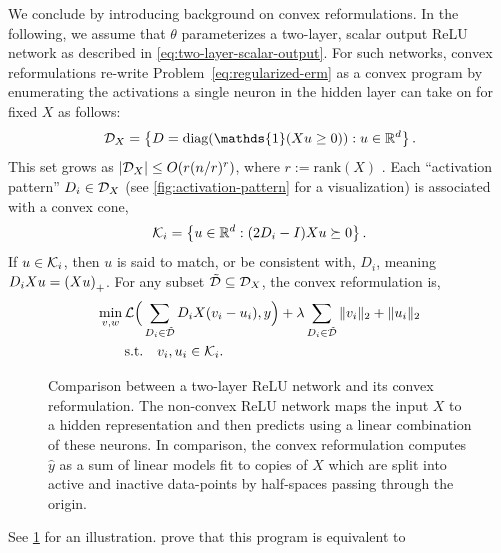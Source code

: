 We conclude by introducing background on convex reformulations.
In the following, we assume that \( \theta \) parameterizes a two-layer,
scalar output ReLU network as described in \cref{eq:two-layer-scalar-output}.
For such networks, convex reformulations re-write
Problem~\ref{eq:regularized-erm} as a convex program by enumerating the
activations a single neuron in the hidden layer can take on for fixed \( X \)
as follows:
\begin{equation}\label{eq:activation-patterns}
    \calD_X = \cbr{D = \diag(\mathds{1}(X u \geq 0)) : u \in \R^d}.
\end{equation}
This set grows as \(|\mathcal{D}_X| \le O(r(n/r)^r)\), where \(r := \text{rank}(X)\)
\citep{pilanci2020convexnn}.
Each ``activation pattern'' \( D_i \in \mathcal{D}_{X} \)
(see \cref{fig:activation-pattern} for a visualization) is associated with
a convex cone,
\begin{equation}\label{eq:activation-cone}
    \mathcal{K}_i = \left\{u \in \mathbb{R}^d : (2D_i - I) X u \succeq 0\right\}.
\end{equation}
If \( u \in \mathcal{K}_i \), then \( u \) is said to match, or be consistent with,
\( D_i \), meaning \( D_i X u = \left(X u\right)_+ \).
For any subset \( \tilde {\mathcal{D}} \subseteq \mathcal{D}_X \),
the convex reformulation is,
\begin{equation}\label{eq:convex-relu-mlp}
    \begin{aligned}
        \min_{v, w} \, & \mathcal{L}\Big(\sum_{D_i \in \tilde {\mathcal{D}}} D_i X (v_i - u_i), y\Big)+\lambda\sum_{D_i \in \tilde {\mathcal{D}}}\|v_i\|_2+\|u_i\|_2 \\
                       & \text{s.t.} \quad v_i, u_i \in \mathcal{K}_i.
    \end{aligned}
\end{equation}
\begin{figure}[t]
    \centering
    
    \caption{Comparison between a two-layer ReLU network and its convex
        reformulation.
        The non-convex ReLU network maps the input \( X \) to a hidden
        representation and then predicts using a linear combination of these
        neurons.
        In comparison, the convex reformulation computes \( \hat{y} \) as a sum
        of linear models fit to copies of \( X \) which are split into active
        and inactive data-points by half-spaces passing
        through the origin.}%
    \label{fig:convex-reformulation}
\end{figure}%
See \cref{fig:convex-reformulation} for an illustration.
\citet{pilanci2020convexnn} prove that this program is equivalent to
